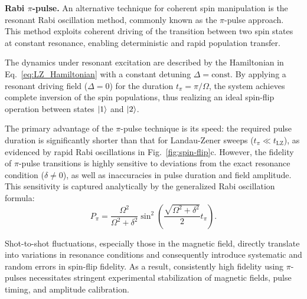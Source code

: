 \textbf{Rabi $\pi$-pulse.}
An alternative technique for coherent spin manipulation is the resonant Rabi oscillation method, commonly known as the $\pi$-pulse approach. This method exploits coherent driving of the transition between two spin states at constant resonance, enabling deterministic and rapid population transfer.

The dynamics under resonant excitation are described by the Hamiltonian in Eq.~\eqref{eq:LZ_Hamiltonian} with a constant detuning $\Delta=\text{const}$. By applying a resonant driving field ($\Delta=0$) for the duration $t_\pi = \pi/\Omega$, the system achieves complete inversion of the spin populations, thus realizing an ideal spin-flip operation between states $\left| 1 \right\rangle$ and $\left| 2 \right\rangle$.

The primary advantage of the $\pi$-pulse technique is its speed: the required pulse duration is significantly shorter than that for Landau-Zener sweeps ($t_\pi \ll t_{\text{LZ}}$), as evidenced by rapid Rabi oscillations in Fig.~\ref{fig:spin-flip}c. However, the fidelity of $\pi$-pulse transitions is highly sensitive to deviations from the exact resonance condition ($\delta \neq 0$), as well as inaccuracies in pulse duration and field amplitude. This sensitivity is captured analytically by the generalized Rabi oscillation formula:
\begin{equation}
P_{\pi} = \frac{\Omega^2}{\Omega^2+\delta^2}\sin^2\left(\frac{\sqrt{\Omega^2+\delta^2}}{2}t_{\pi}\right).
\label{eq:pi_fidelity}
\end{equation}

Shot-to-shot fluctuations, especially those in the magnetic field, directly translate into variations in resonance conditions and consequently introduce systematic and random errors in spin-flip fidelity. As a result, consistently high fidelity using $\pi$-pulses necessitates stringent experimental stabilization of magnetic fields, pulse timing, and amplitude calibration.


